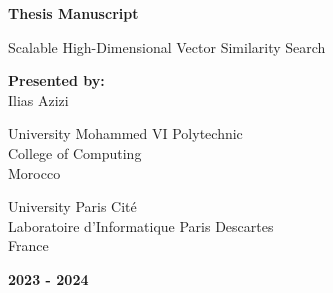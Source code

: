 \documentclass[12pt]{thesis}
\begin{document}
\graphicspath{{../img/misc/}}
\begin{preliminary}

%

\begin{titlepage}
    \centering
    \vspace*{3cm} %

    {\Huge \textbf{Thesis Manuscript}\\}
    \vspace{1.5cm}

    {\LARGE Scalable High-Dimensional Vector Similarity Search\\}

    \vfill

    {\Large \textbf{Presented by:} \\ \Large Ilias Azizi}

    \vspace{1.5cm}

    {\Large University Mohammed VI Polytechnic\\
    College of Computing\\
    Morocco}
    \vspace{1cm}

    {\Large University Paris Cité\\
    Laboratoire d'Informatique Paris Descartes\\
    France}
    \vspace{1cm}

    {\Large \textbf{2023 - 2024}\\}
    
\end{titlepage}


\clearpage

\begin{abstract}
The unprecedented increase in high-dimensional data across sectors like agriculture, healthcare, cybersecurity, seismology, and finance has led to an urgent demand for sophisticated analytical systems capable of processing and exploring large datasets. These datasets, often reaching terabytes in size and involving hundreds or thousands of dimensions, require advanced tools to detect valuable patterns and derive insights.


\end{abstract}
\end{preliminary}
\end{document}
